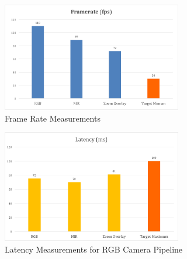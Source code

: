 \begin{figure}[H]
\centering
\includegraphics[width=0.7\textwidth]{images/framerate.png}
\caption{Frame Rate Measurements}
\end{figure}

\begin{figure}[H]
\centering
\includegraphics[width=0.7\textwidth]{images/latency.png}
\caption{Latency Measurements for RGB Camera Pipeline}
\end{figure}

